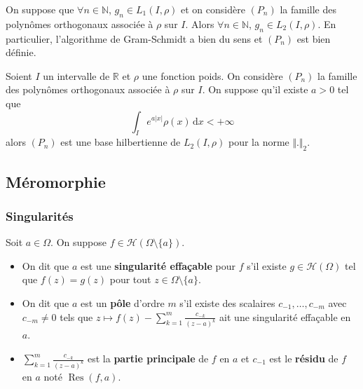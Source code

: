 
  \begin{lemma}
    On suppose que $\forall n \in \mathbb{N}$, $g_n \in L_1(I, \rho)$ et on considère $(P_n)$ la famille des polynômes orthogonaux associée à $\rho$ sur $I$. Alors $\forall n \in \mathbb{N}$, $g_n \in L_2(I, \rho)$. En particulier, l'algorithme de Gram-Schmidt a bien du sens et $(P_n)$ est bien définie.
  \end{lemma}


  \begin{application}
    Soient $I$ un intervalle de $\mathbb{R}$ et $\rho$ une fonction poids. On considère $(P_n)$ la famille des polynômes orthogonaux associée à $\rho$ sur $I$.
    \newpar
    On suppose qu'il existe $a > 0$ tel que
    \[ \int_I e^{a \vert x \vert} \rho(x) \, \mathrm{d}x < +\infty \]
    alors $(P_n)$ est une base hilbertienne de $L_2(I, \rho)$ pour la norme $\Vert . \Vert_2$.
  \end{application}

  \subsection{Méromorphie}

  \subsubsection{Singularités}


  \begin{definition}
    \label{245-2}
    Soit $a \in \Omega$. On suppose $f \in \mathcal{H}(\Omega \setminus \{ a \})$.
    \begin{itemize}
      \item On dit que $a$ est une \textbf{singularité effaçable} pour $f$ s'il existe $g \in \mathcal{H}(\Omega)$ tel que $f(z) = g(z)$ pour tout $z \in \Omega \setminus \{ a \}$.
      \item On dit que $a$ est un \textbf{pôle} d'ordre $m$ s'il existe des scalaires $c_{-1}, \dots, c_{-m}$ avec $c_{-m} \neq 0$ tels que $z \mapsto f(z) - \sum_{k=1}^m \frac{c_{-k}}{(z-a)^{k}}$ ait une singularité effaçable en $a$.
      \item $\sum_{k=1}^m \frac{c_{-k}}{(z-a)^{k}}$ est la \textbf{partie principale} de $f$ en $a$ et $c_{-1}$ est le \textbf{résidu} de $f$ en $a$ noté $\operatorname{Res}(f,a)$.
    \end{itemize}
  \end{definition}


